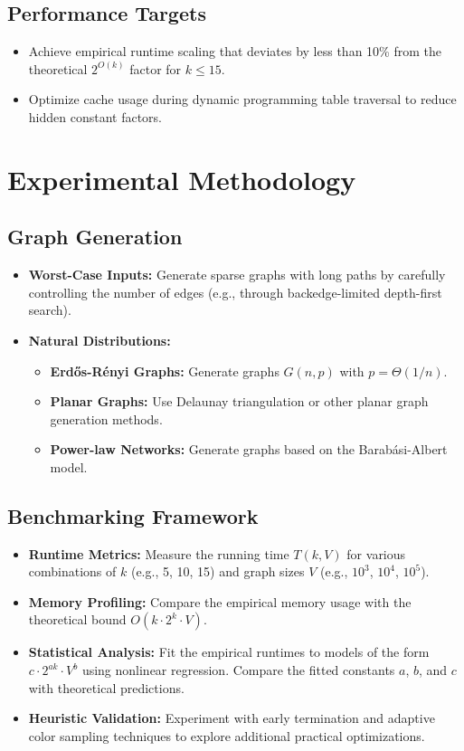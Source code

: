 \subsection{Performance Targets}
\begin{itemize}
    \item Achieve empirical runtime scaling that deviates by less than 10\% from the theoretical \(2^{O(k)}\) factor for \(k\leq15\).
    \item Optimize cache usage during dynamic programming table traversal to reduce hidden constant factors.
\end{itemize}

\section{Experimental Methodology}
\subsection{Graph Generation}
\begin{itemize}
    \item \textbf{Worst-Case Inputs:} Generate sparse graphs with long paths by carefully controlling the number of edges (e.g., through backedge-limited depth-first search).
    \item \textbf{Natural Distributions:}
    \begin{itemize}
        \item \textbf{Erd\H{o}s-R\'enyi Graphs:} Generate graphs \(G(n,p)\) with \(p=\Theta(1/n)\).
        \item \textbf{Planar Graphs:} Use Delaunay triangulation or other planar graph generation methods.
        \item \textbf{Power-law Networks:} Generate graphs based on the Barab\'asi-Albert model.
    \end{itemize}
\end{itemize}

\subsection{Benchmarking Framework}
\begin{itemize}
    \item \textbf{Runtime Metrics:} Measure the running time \(T(k,V)\) for various combinations of \(k\) (e.g., 5, 10, 15) and graph sizes \(V\) (e.g., \(10^3\), \(10^4\), \(10^5\)).
    \item \textbf{Memory Profiling:} Compare the empirical memory usage with the theoretical bound \(O(k \cdot 2^k \cdot V)\).
    \item \textbf{Statistical Analysis:} Fit the empirical runtimes to models of the form \(c \cdot 2^{a k} \cdot V^b\) using nonlinear regression. Compare the fitted constants \(a\), \(b\), and \(c\) with theoretical predictions.
    \item \textbf{Heuristic Validation:} Experiment with early termination and adaptive color sampling techniques to explore additional practical optimizations.
\end{itemize}

